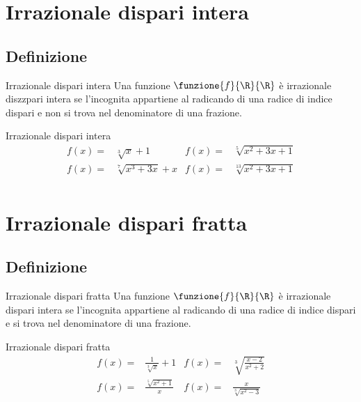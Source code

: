 \section{Irrazionale dispari intera}
\subsection{Definizione}
\begin{definizionet}{Irrazionale dispari intera}{}
	Una funzione $\funzione{f}{\R}{\R}$ è irrazionale diszzpari intera se l'incognita appartiene al radicando di una radice di indice dispari e  non si trova nel denominatore di una frazione. 
\end{definizionet}
\begin{esempiot}{Irrazionale dispari intera}{}
	\begin{align*}
	f(x)=&\sqrt[3]{x}+1&f(x)=&\sqrt[5]{x^2+3x+1}\\
	f(x)=&\sqrt[7]{x^3+3x}+x&f(x)=&\sqrt[13]{x^2+3x+1}\\
	\end{align*}
\end{esempiot}
\section{Irrazionale dispari fratta}
\subsection{Definizione}
\begin{definizionet}{Irrazionale dispari fratta}{}
	Una funzione $\funzione{f}{\R}{\R}$ è irrazionale dispari intera se l'incognita appartiene al radicando di una radice di indice dispari e   si trova nel denominatore di una frazione. 
\end{definizionet}
\begin{esempiot}{Irrazionale dispari fratta}{}
	\begin{align*}
	f(x)=&\frac{1}{\sqrt[3]{x}}+1&f(x)=&\sqrt[3]{\frac{x-2}{x^2+2}}\\
	f(x)=&\frac{\sqrt[5]{x^2+1}}{x}&f(x)=&\frac{x}{\sqrt[3]{x^2-3}}\\
	\end{align*}
\end{esempiot}